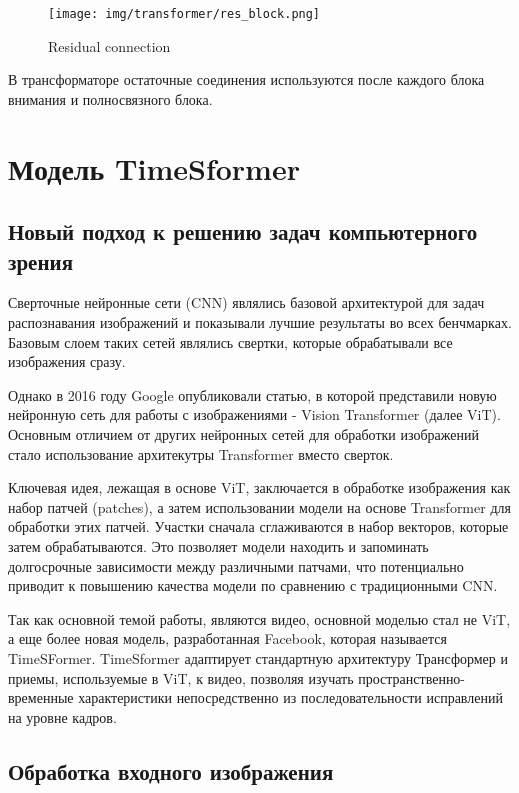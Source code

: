 \documentclass[PMI,VKR]{HSEUniversity}
\begin{document}
\begin{figure}[h]
    \centering
    \texttt{[image: img/transformer/res\_block.png]}
    \caption{Residual connection}
\end{figure}

В трансформаторе остаточные соединения используются после каждого блока внимания и полносвязного блока.

\section{Модель TimeSformer}
\subsection{Новый подход к решению задач компьютерного зрения}

Сверточные нейронные сети (CNN) являлись базовой архитектурой для задач распознавания изображений и показывали лучшие результаты во всех бенчмарках. Базовым слоем таких сетей являлись свертки, которые обрабатывали все изображения сразу.

Однако в 2016 году Google опубликовали статью, в которой представили новую нейронную сеть для работы с изображениями - Vision Transformer\cite{vit:2016} (далее ViT). Основным отличием от других нейронных сетей для обработки изображений стало использование архитекутры Transformer вместо сверток.

Ключевая идея, лежащая в основе ViT, заключается в обработке изображения как набор патчей (patches), а затем использовании модели на основе Transformer для обработки этих патчей. Участки сначала сглаживаются в набор векторов, которые затем обрабатываются. Это позволяет модели находить и запоминать долгосрочные зависимости между различными патчами, что потенциально приводит к повышению качества модели по сравнению с традиционными CNN.

Так как основной темой работы, являются видео, основной моделью стал не ViT, а еще более новая модель, разработанная Facebook, которая называется TimeSFormer.
TimeSformer\cite{timesformer:2021} адаптирует стандартную архитектуру Трансформер и приемы, используемые в ViT, к видео, позволяя изучать пространственно-временные характеристики непосредственно из последовательности исправлений на уровне кадров.

\subsection{Обработка входного изображения}
\end{document}
